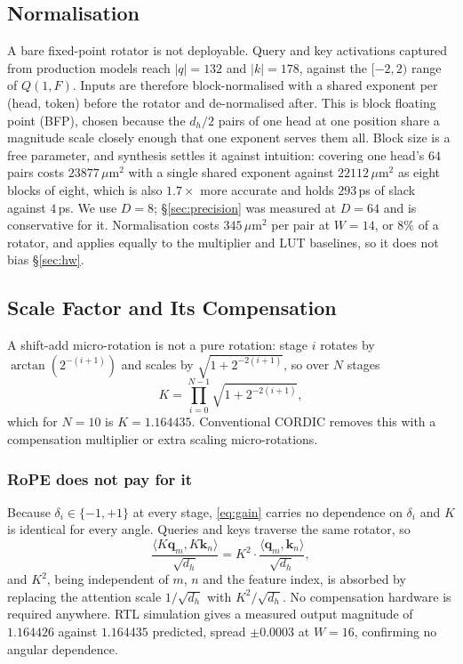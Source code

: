 \documentclass[conference]{IEEEtran}
\begin{document}
\subsection{Normalisation}
\label{sec:bfp}

A bare fixed-point rotator is not deployable. Query and key activations
captured from production models reach $|q| = 132$ and $|k| = 178$, against the
$[-2,2)$ range of $Q(1,F)$. Inputs are therefore block-normalised with a shared
exponent per (head, token) before the rotator and de-normalised after. This is
block floating point (BFP), chosen because the $d_h/2$ pairs of one head at one position
share a magnitude scale closely enough that one exponent serves them all.
Block size is a free parameter, and synthesis settles it against intuition:
covering one head's $64$ pairs costs $23877$\,$\mu$m$^2$ with a single shared
exponent against $22112$\,$\mu$m$^2$ as eight blocks of eight, which is also
$1.7\times$ more accurate and holds $293$\,ps of slack against $4$\,ps. We use
$D=8$; \S\ref{sec:precision} was measured at $D=64$ and is conservative for it.
Normalisation costs $345$\,$\mu$m$^2$ per pair at $W=14$, or $8\%$ of a
rotator, and applies equally to the multiplier and LUT baselines, so it does
not bias \S\ref{sec:hw}.

\subsection{Scale Factor and Its Compensation}
\label{sec:gain}

A shift-add micro-rotation is not a pure rotation: stage $i$ rotates by
$\arctan(2^{-(i+1)})$ and scales by $\sqrt{1+2^{-2(i+1)}}$, so over $N$ stages
\begin{equation}
  K = \textstyle\prod_{i=0}^{N-1}\sqrt{1 + 2^{-2(i+1)}},
  \label{eq:gain}
\end{equation}
which for $N=10$ is $K = 1.164435$. Conventional CORDIC removes this with a
compensation multiplier or extra scaling micro-rotations.

\subsubsection{RoPE does not pay for it}
Because $\delta_i \in \{-1,+1\}$ at every stage, \eqref{eq:gain} carries no
dependence on $\delta_i$ and $K$ is identical for every angle. Queries and keys
traverse the same rotator, so
\begin{equation}
  \frac{\langle K\mathbf{q}_m, K\mathbf{k}_n\rangle}{\sqrt{d_h}}
  = K^{2}\cdot\frac{\langle \mathbf{q}_m, \mathbf{k}_n\rangle}{\sqrt{d_h}},
  \label{eq:fold}
\end{equation}
and $K^{2}$, being independent of $m$, $n$ and the feature index, is absorbed
by replacing the attention scale $1/\sqrt{d_h}$ with $K^{2}/\sqrt{d_h}$. No
compensation hardware is required anywhere. RTL simulation gives a measured
output magnitude of $1.164426$ against $1.164435$ predicted, spread
$\pm 0.0003$ at $W=16$, confirming no angular dependence.
\end{document}
